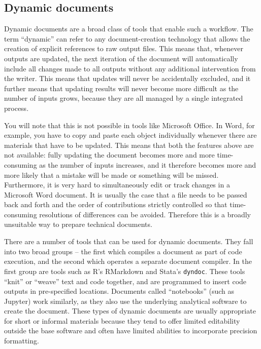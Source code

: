 \subsection{Dynamic documents}

Dynamic documents are a broad class of tools that enable such a workflow.
The term ``dynamic'' can refer to any document-creation technology
that allows the creation of explicit references to raw output files.
This means that, whenever outputs are updated,
the next iteration of the document will automatically include
all changes made to all outputs without any additional intervention from the writer.
This means that updates will never be accidentally excluded,
and it further means that updating results will never become more difficult
as the number of inputs grows,
because they are all managed by a single integrated process.

You will note that this is not possible in tools like Microsoft Office.
In Word, for example, you have to copy and paste each object individually
whenever there are materials that have to be updated.
This means that both the features above are not available:
fully updating the document becomes more and more time-consuming
as the number of inputs increases,
and it therefore becomes more and more likely
that a mistake will be made or something will be missed.
Furthermore, it is very hard to simultaneously edit or track changes
in a Microsoft Word document.
It is usually the case that a file needs to be passed back and forth
and the order of contributions strictly controlled
so that time-consuming resolutions of differences can be avoided.
Therefore this is a broadly unsuitable way to prepare technical documents.

There are a number of tools that can be used for dynamic documents.
They fall into two broad groups --
the first which compiles a document as part of code execution,
and the second which operates a separate document compiler.
In the first group are tools such as R's RMarkdown and Stata's \texttt{dyndoc}.
These tools ``knit'' or ``weave'' text and code together,
and are programmed to insert code outputs in pre-specified locations.
Documents called ``notebooks'' (such as Jupyter) work similarly,
as they also use the underlying analytical software to create the document.
These types of dynamic documents are usually appropriate for short or informal materials
because they tend to offer limited editability outside the base software
and often have limited abilities to incorporate precision formatting.

